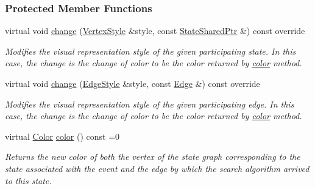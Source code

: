 \subsubsection*{Protected Member Functions}
\begin{DoxyCompactItemize}
\item 
virtual void \hyperlink{structevent_1_1VertexEdgeColor_ab9f1823b9b05d53a8f9d30274080b765}{change} (\hyperlink{structVertexStyle}{Vertex\+Style} \&style, const \hyperlink{structevent_1_1UniformChange_a8f41f1a24c711875b55419d9f0eb6bd2}{State\+Shared\+Ptr} \&) const override\hypertarget{structevent_1_1VertexEdgeColor_ab9f1823b9b05d53a8f9d30274080b765}{}\label{structevent_1_1VertexEdgeColor_ab9f1823b9b05d53a8f9d30274080b765}

\begin{DoxyCompactList}\small\item\em Modifies the visual representation style of the given participating state. In this case, the change is the change of color to be the color returned by \hyperlink{structevent_1_1VertexEdgeColor_a93a0ce903f43b2758402b03d8c4a80dd}{color} method. \end{DoxyCompactList}\item 
virtual void \hyperlink{structevent_1_1VertexEdgeColor_a4009d30743d0e379f2678454138032e6}{change} (\hyperlink{structEdgeStyle}{Edge\+Style} \&style, const \hyperlink{structevent_1_1UniformChange_a74eab4759202393dcf9438a25bd9261e}{Edge} \&) const override\hypertarget{structevent_1_1VertexEdgeColor_a4009d30743d0e379f2678454138032e6}{}\label{structevent_1_1VertexEdgeColor_a4009d30743d0e379f2678454138032e6}

\begin{DoxyCompactList}\small\item\em Modifies the visual representation style of the given participating edge. In this case, the change is the change of color to be the color returned by \hyperlink{structevent_1_1VertexEdgeColor_a93a0ce903f43b2758402b03d8c4a80dd}{color} method. \end{DoxyCompactList}\item 
virtual \hyperlink{colors_8h_ab87bacfdad76e61b9412d7124be44c1c}{Color} \hyperlink{structevent_1_1VertexEdgeColor_a93a0ce903f43b2758402b03d8c4a80dd}{color} () const =0
\begin{DoxyCompactList}\small\item\em Returns the new color of both the vertex of the state graph corresponding to the state associated with the event and the edge by which the search algorithm arrived to this state. \end{DoxyCompactList}\end{DoxyCompactItemize}
